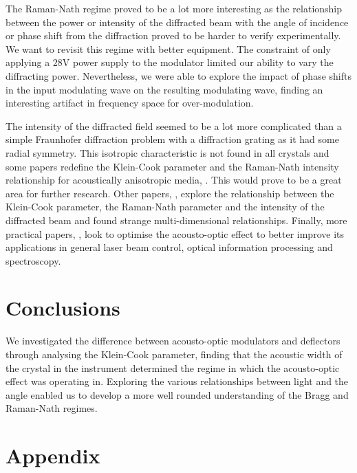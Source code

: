 \documentclass[aps,prl,reprint,10pt,amsmath,amssymb,superscriptaddress,a4paper]{revtex4-2}
\begin{document}
The Raman-Nath regime proved to be a lot more interesting as the relationship between the power or intensity of the diffracted beam with the angle of incidence or phase shift from the diffraction 
proved to be harder to verify experimentally. We want to revisit this regime with better equipment. The constraint of only applying a 28V power supply to the modulator limited our ability to vary the 
diffracting power. Nevertheless, we were able to explore the impact of phase shifts in the input modulating wave on the resulting modulating wave, finding an interesting artifact in frequency space 
for over-modulation.

The intensity of the diffracted field seemed to be a lot more complicated than a simple Fraunhofer diffraction problem with a diffraction grating as it had some radial symmetry. This isotropic characteristic 
is not found in all crystals and some papers redefine the Klein-Cook parameter and the Raman-Nath intensity relationship for acoustically anisotropic media, \citep{Zakharov}. This would prove to be a great area for further research. 
Other papers, \citep{Kwiek}, explore the relationship between the Klein-Cook parameter, the Raman-Nath parameter and the intensity of the diffracted beam and found strange multi-dimensional relationships. Finally, more practical papers, 
\citep{Kotov}, look to optimise the acousto-optic effect to better improve its applications in general laser beam control, optical information processing and spectroscopy.

\section{Conclusions}

We investigated the difference between acousto-optic modulators and deflectors through analysing the Klein-Cook parameter, finding that the acoustic width of the crystal in the instrument determined the regime in which the acousto-optic 
effect was operating in. Exploring the various relationships between light and the angle enabled us to develop a more well rounded understanding of the Bragg and Raman-Nath regimes.

\section{Appendix}
\end{document}
